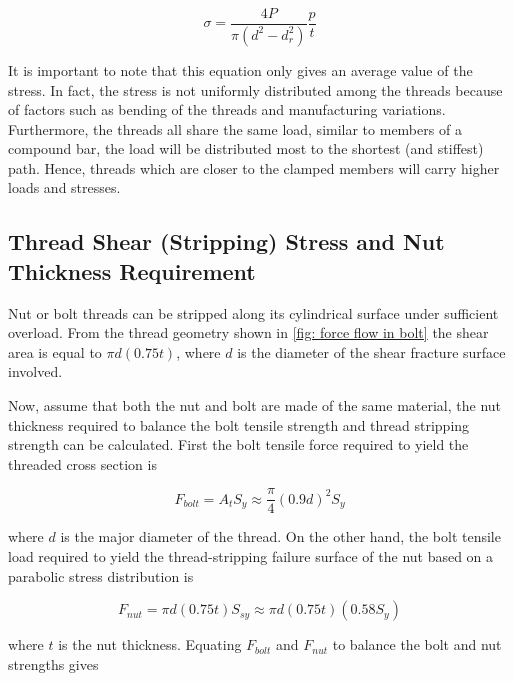 \documentclass[
10pt,
a4paper,
openany,
svgnames,
]{book}
\begin{document}
\begin{equation}
  \sigma  = \frac{4P}{\pi (d^2 - d_r^2)}\frac{p}{t}
\end{equation}

It is important to note that this equation only gives an average value of the stress. In fact, the stress is not uniformly distributed among the threads because of factors such as bending of the threads and manufacturing variations. Furthermore, the threads all share the same load, similar to members of a compound bar, the load will be distributed most to the shortest (and stiffest) path. Hence, threads which are closer to the clamped members will carry higher loads and stresses.

\subsection{Thread Shear (Stripping) Stress and Nut Thickness
  Requirement}

Nut or bolt threads can be stripped along its cylindrical surface under sufficient overload. From the thread geometry shown in \cref{fig: force flow in bolt} the shear area is equal to $\pi d(0.75t)$, where $d$ is the diameter of the shear fracture surface involved.

Now, assume that both the nut and bolt are made of the same material, the nut thickness required to balance the bolt tensile strength and thread stripping strength can be calculated. First the bolt tensile force required to yield the threaded cross section is

\[F_{bolt} = A_tS_y \approx \frac{\pi}{4}(0.9d)^2S_y\]

where $d$ is the major diameter of the thread. On the other hand, the bolt tensile load required to yield the thread-stripping failure surface of the nut based on a parabolic stress distribution is

\[F_{nut} = \pi d(0.75t)S_{sy} \approx \pi d(0.75t)(0.58S_y)\]

where $t$ is the nut thickness. Equating $F_{bolt}$ and $F_{nut}$ to balance the bolt and nut strengths gives

\begin{figure}[h]
  \centering
\end{figure}
\end{document}
